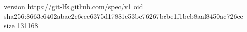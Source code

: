 version https://git-lfs.github.com/spec/v1
oid sha256:8663c6402abac2c6cee6375d17881c53bc76267bcbe1f1beb8aaf8450ac726ce
size 131168
